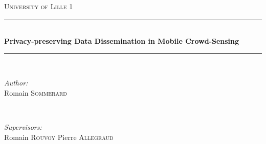 	\begin{titlepage}
		
		\newcommand{\HRule}{\rule{\linewidth}{0.5mm}} %
		
		\center %
		
		
		\textsc{\LARGE University of Lille 1}\\[1.5cm] %
		
		
		\HRule \\[0.4cm]
		\huge \bfseries Privacy-preserving Data Dissemination in Mobile Crowd-Sensing\\[0.4cm] %
		\HRule \\[1.5cm]
		
		
		\begin{minipage}{0.4\textwidth}
			\begin{flushleft} \large
				\emph{Author:}\\
				Romain \textsc{Sommerard} %
			\end{flushleft}
		\end{minipage}
		~
		\begin{minipage}{0.4\textwidth}
			\begin{flushright} \large
				\emph{Supervisors:} \\
				Romain \textsc{Rouvoy} %
				Pierre \textsc{Allegraud}
			\end{flushright}
		\end{minipage}\\[2cm]
		

\end{titlepage}
